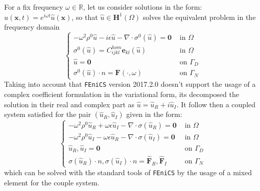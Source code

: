 For a fix frequency $\omega \in \mathbb{R}$, let us consider solutions in the form: $u(\mathbf{x},t) = e^{ i \omega t}\hat{u}(\mathbf{x})$, so that $\hat{u}\in \mathbf{H}^1(\Omega)$ solves the equivalent problem in the frequency domain
\begin{equation*}
    \left \{
    \begin{array}{cc}
        -\omega^2 \rho^{0} \hat{u} - i \epsilon \hat{u} - \nabla \cdot \sigma^0 (\hat{u}) = \mathbf{0} & \text{ in } \Omega\\
        \sigma^{0}(\hat{u})  =  C_{ijkl}^{hom}\mathbf{e}_{kl}(\hat{u}) & \text{ in } \Omega \\
        \hat{u} = \mathbf{0} & \text{ on } \Gamma_D\\
        \sigma^{0}(\hat{u}) \cdot n = \mathbf{F}(\cdot, \omega) & \text{ on } \Gamma_N
    \end{array}
    \right .
\end{equation*}
Taking into account that \texttt{FEniCS} version 2017.2.0 doesn't support the usage of a complex coefficient formulation in the variational form, its decomposed the solution in their real and complex part as $\hat{u} = \hat{u}_R + i \hat{u}_I$. It follow then a coupled system satisfied for the pair $(\hat{u}_R, \hat{u}_I)$ given in the form:
\begin{equation*}
    \left \{
    \begin{array}{cc}
        -\omega^2 \rho^0 \hat{u}_R +  \omega \epsilon \hat{u}_I - \nabla \cdot \sigma (\hat{u}_R) = \mathbf{0} & \text{ in } \Omega \\
        -\omega^2 \rho^0 \hat{u}_I - \omega \epsilon \hat{u}_R - \nabla \cdot \sigma (\hat{u}_I) = \mathbf{0} & \text{ in } \Omega \\
        \hat{u}_R, \hat{u}_I = \mathbf{0} & \text{ on } \Gamma_D \\
        \sigma(\hat{u}_R)\cdot n, \sigma(\hat{u}_I)\cdot n = \hat{\mathbf{F}}_R, \hat{\mathbf{F}}_I & \text{ on }\Gamma_N
    \end{array}
    \right.
\end{equation*}
which can be solved with the standard tools of \texttt{FEniCS} by the usage of a mixed element for the couple system.

